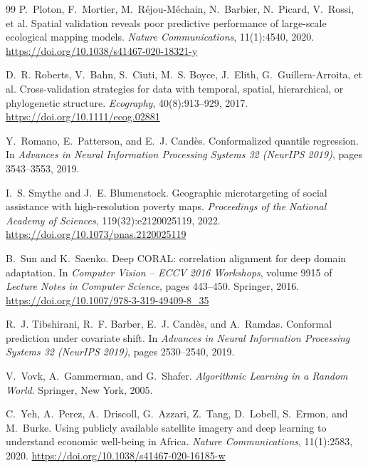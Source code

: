 \documentclass[11pt]{article}
\begin{document}
\begin{thebibliography}{99}
P.~Ploton, F.~Mortier, M.~R\'ejou-M\'echain, N.~Barbier, N.~Picard, V.~Rossi,
et al.
\newblock Spatial validation reveals poor predictive performance of large-scale
ecological mapping models.
\newblock \emph{Nature Communications}, 11(1):4540, 2020.
\newblock \url{https://doi.org/10.1038/s41467-020-18321-y}

D.~R. Roberts, V.~Bahn, S.~Ciuti, M.~S. Boyce, J.~Elith, G.~Guillera-Arroita,
et al.
\newblock Cross-validation strategies for data with temporal, spatial,
hierarchical, or phylogenetic structure.
\newblock \emph{Ecography}, 40(8):913--929, 2017.
\newblock \url{https://doi.org/10.1111/ecog.02881}

Y.~Romano, E.~Patterson, and E.~J. Cand\`es.
\newblock Conformalized quantile regression.
\newblock In \emph{Advances in Neural Information Processing Systems 32
(NeurIPS 2019)}, pages 3543--3553, 2019.

I.~S. Smythe and J.~E. Blumenstock.
\newblock Geographic microtargeting of social assistance with high-resolution
poverty maps.
\newblock \emph{Proceedings of the National Academy of Sciences},
119(32):e2120025119, 2022.
\newblock \url{https://doi.org/10.1073/pnas.2120025119}

B.~Sun and K.~Saenko.
\newblock Deep CORAL: correlation alignment for deep domain adaptation.
\newblock In \emph{Computer Vision -- ECCV 2016 Workshops}, volume 9915 of
\emph{Lecture Notes in Computer Science}, pages 443--450. Springer, 2016.
\newblock \url{https://doi.org/10.1007/978-3-319-49409-8_35}

R.~J. Tibshirani, R.~F. Barber, E.~J. Cand\`es, and A.~Ramdas.
\newblock Conformal prediction under covariate shift.
\newblock In \emph{Advances in Neural Information Processing Systems 32
(NeurIPS 2019)}, pages 2530--2540, 2019.

V.~Vovk, A.~Gammerman, and G.~Shafer.
\newblock \emph{Algorithmic Learning in a Random World}.
\newblock Springer, New York, 2005.

C.~Yeh, A.~Perez, A.~Driscoll, G.~Azzari, Z.~Tang, D.~Lobell, S.~Ermon, and
M.~Burke.
\newblock Using publicly available satellite imagery and deep learning to
understand economic well-being in Africa.
\newblock \emph{Nature Communications}, 11(1):2583, 2020.
\newblock \url{https://doi.org/10.1038/s41467-020-16185-w}

\end{thebibliography}
\end{document}
